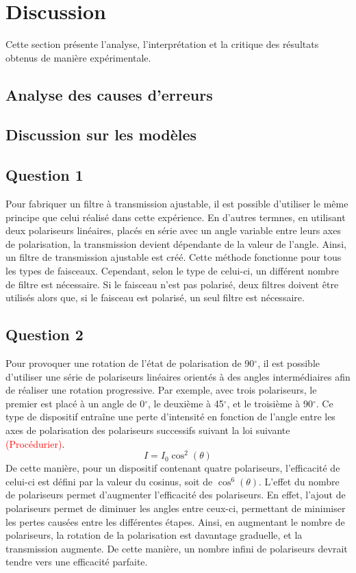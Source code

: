 \documentclass[11pt,letterpaper]{article}
\begin{document}
\section{Discussion}
Cette section présente l'analyse, l'interprétation et la critique des résultats obtenus de manière expérimentale.

\subsection{Analyse des causes d'erreurs}

\subsection{Discussion sur les modèles}

\subsection{Question 1}
Pour fabriquer un filtre à transmission ajustable, il est possible d'utiliser le même principe que celui réalisé dans cette expérience. En d'autres termnes, en utilisant deux polariseurs linéaires, placés en série avec un angle variable entre leurs axes de polarisation, la transmission devient dépendante de la valeur de l'angle. Ainsi, un filtre de transmission ajustable est créé. Cette méthode fonctionne pour tous les types de faisceaux. Cependant, selon le type de celui-ci, un différent nombre de filtre est nécessaire. Si le faisceau n'est pas polarisé, deux filtres doivent être utilisés alors que, si le faisceau est polarisé, un seul filtre est nécessaire.

\subsection{Question 2}
Pour provoquer une rotation de l'état de polarisation de 90$^\circ$, il est possible d'utiliser une série de polariseurs linéaires orientés à des angles intermédiaires afin de réaliser une rotation progressive. Par exemple, avec trois polariseurs, le premier est placé à un angle de 0$^\circ$, le deuxième à 45$^\circ$, et le troisième à 90$^\circ$. Ce type de dispositif entraîne une perte d'intensité en fonction de l'angle entre les axes de polarisation des polariseurs successifs suivant la loi suivante \textcolor{red}{(Procédurier)}.
\begin{equation}
  I=I_{0}\cos^{2}(\theta)
\end{equation}
De cette manière, pour un dispositif contenant quatre polariseurs, l'efficacité de celui-ci est défini par la valeur du cosinus, soit de $\cos^{6}(\theta)$. L'effet du nombre de polariseurs permet d'augmenter l'efficacité des polariseurs. En effet, l'ajout de polariseurs permet de diminuer les angles entre ceux-ci, permettant de minimiser les pertes causées entre les différentes étapes. Ainsi, en augmentant le nombre de polariseurs, la rotation de la polarisation est davantage graduelle, et la transmission augmente. De cette manière, un nombre infini de polariseurs devrait tendre vers une efficacité parfaite.
\end{document}
